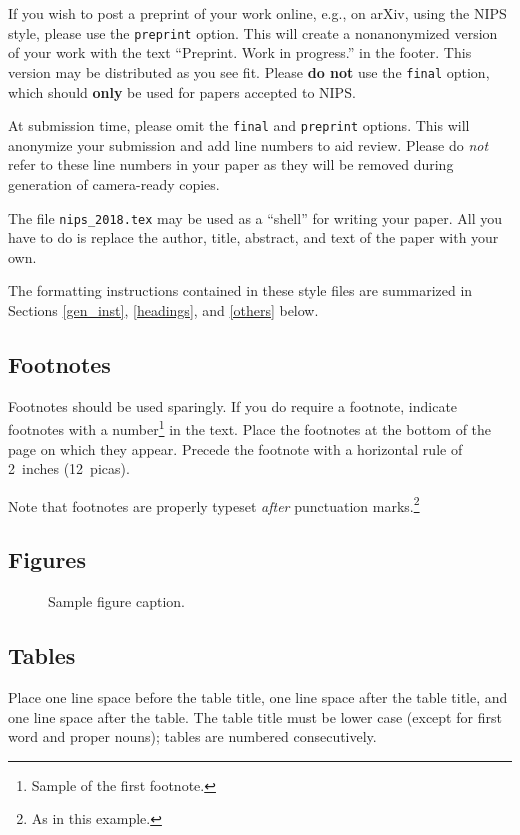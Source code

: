 \documentclass{article}
\begin{document}
If you wish to post a preprint of your work online, e.g., on arXiv,
using the NIPS style, please use the \verb+preprint+ option. This will
create a nonanonymized version of your work with the text
``Preprint. Work in progress.''  in the footer. This version may be
distributed as you see fit. Please \textbf{do not} use the
\verb+final+ option, which should \textbf{only} be used for papers
accepted to NIPS.

At submission time, please omit the \verb+final+ and \verb+preprint+
options. This will anonymize your submission and add line numbers to aid
review. Please do \emph{not} refer to these line numbers in your paper
as they will be removed during generation of camera-ready copies.

The file \verb+nips_2018.tex+ may be used as a ``shell'' for writing
your paper. All you have to do is replace the author, title, abstract,
and text of the paper with your own.

The formatting instructions contained in these style files are
summarized in Sections \ref{gen_inst}, \ref{headings}, and
\ref{others} below.

\subsection{Footnotes}

Footnotes should be used sparingly.  If you do require a footnote,
indicate footnotes with a number\footnote{Sample of the first
  footnote.} in the text. Place the footnotes at the bottom of the
page on which they appear.  Precede the footnote with a horizontal
rule of 2~inches (12~picas).

Note that footnotes are properly typeset \emph{after} punctuation
marks.\footnote{As in this example.}

\subsection{Figures}

\begin{figure}
  \centering
  \fbox{\rule[-.5cm]{0cm}{4cm} \rule[-.5cm]{4cm}{0cm}}
  \caption{Sample figure caption.}
\end{figure}

\subsection{Tables}

Place one line space before the table title, one line space after the
table title, and one line space after the table. The table title must
be lower case (except for first word and proper nouns); tables are
numbered consecutively.
\end{document}
